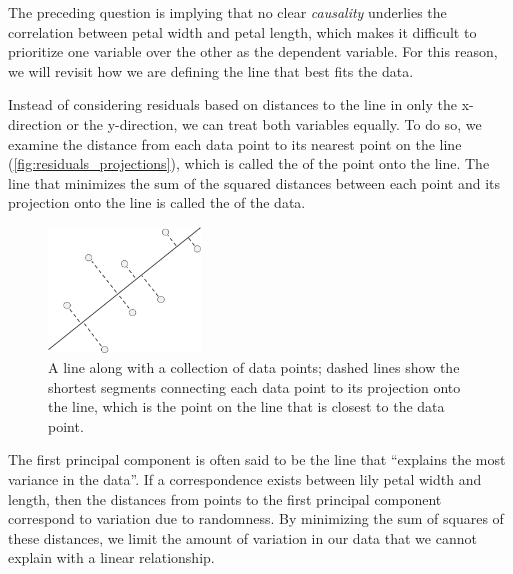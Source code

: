 \begin{note}\end{note}

\begin{qbox}\end{qbox}

The preceding question is implying that no clear \textit{causality} underlies the correlation between petal width and petal length, which makes it difficult to prioritize one variable over the other as the dependent variable. For this reason, we will revisit how we are defining the line that best fits the data.

Instead of considering residuals based on distances to the line in only the x-direction or the y-direction, we can treat both variables equally. To do so, we examine the distance from each data point to its nearest point on the line (\autoref{fig:residuals_projections}), which is called the  of the point onto the line. The line that minimizes the sum of the squared distances between each point and its projection onto the line is called the  of the data.\\

\begin{figure}[h]
\centering
\mySfFamily
\includegraphics[width = 0.36\textwidth]{../images/residuals_projections.png}
\caption{A line along with a collection of data points; dashed lines show the shortest segments connecting each data point to its projection onto the line, which is the point on the line that is closest to the data point.}
\label{fig:residuals_projections}
\end{figure}

The first principal component is often said to be the line that ``explains the most variance in the data''. If a correspondence exists between lily petal width and length, then the distances from points to the first principal component correspond to variation due to randomness. By minimizing the sum of squares of these distances, we limit the amount of variation in our data that we cannot explain with a linear relationship.

